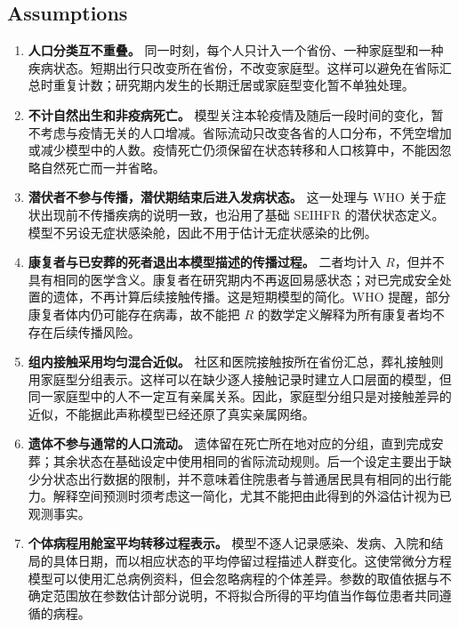 \subsection{Assumptions}

\begin{enumerate}[label=\textbf{A\arabic*.},leftmargin=2.6em,itemsep=0.6em]

\item \textbf{人口分类互不重叠。}
同一时刻，每个人只计入一个省份、一种家庭型和一种疾病状态。短期出行只改变所在省份，不改变家庭型。这样可以避免在省际汇总时重复计数；研究期内发生的长期迁居或家庭型变化暂不单独处理。

\item \textbf{不计自然出生和非疫病死亡。}
模型关注本轮疫情及随后一段时间的变化，暂不考虑与疫情无关的人口增减。省际流动只改变各省的人口分布，不凭空增加或减少模型中的人数。疫情死亡仍须保留在状态转移和人口核算中，不能因忽略自然死亡而一并省略。

\item \textbf{潜伏者不参与传播，潜伏期结束后进入发病状态。}
这一处理与 WHO 关于症状出现前不传播疾病的说明一致\cite{whofactsheet}，也沿用了基础 SEIHFR 的潜伏状态定义。模型不另设无症状感染舱，因此不用于估计无症状感染的比例。

\item \textbf{康复者与已安葬的死者退出本模型描述的传播过程。}
二者均计入 $R$，但并不具有相同的医学含义。康复者在研究期内不再返回易感状态；对已完成安全处置的遗体，不再计算后续接触传播。这是短期模型的简化。WHO 提醒，部分康复者体内仍可能存在病毒，故不能把 $R$ 的数学定义解释为所有康复者均不存在后续传播风险\cite{whofactsheet}。

\item \textbf{组内接触采用均匀混合近似。}
社区和医院接触按所在省份汇总，葬礼接触则用家庭型分组表示。这样可以在缺少逐人接触记录时建立人口层面的模型，但同一家庭型中的人不一定互有亲属关系。因此，家庭型分组只是对接触差异的近似，不能据此声称模型已经还原了真实亲属网络。

\item \textbf{遗体不参与通常的人口流动。}
遗体留在死亡所在地对应的分组，直到完成安葬；其余状态在基础设定中使用相同的省际流动规则。后一个设定主要出于缺少分状态出行数据的限制，并不意味着住院患者与普通居民具有相同的出行能力。解释空间预测时须考虑这一简化，尤其不能把由此得到的外溢估计视为已观测事实。

\item \textbf{个体病程用舱室平均转移过程表示。}
模型不逐人记录感染、发病、入院和结局的具体日期，而以相应状态的平均停留过程描述人群变化。这使常微分方程模型可以使用汇总病例资料，但会忽略病程的个体差异。参数的取值依据与不确定范围放在参数估计部分说明，不将拟合所得的平均值当作每位患者共同遵循的病程。


\end{enumerate}
